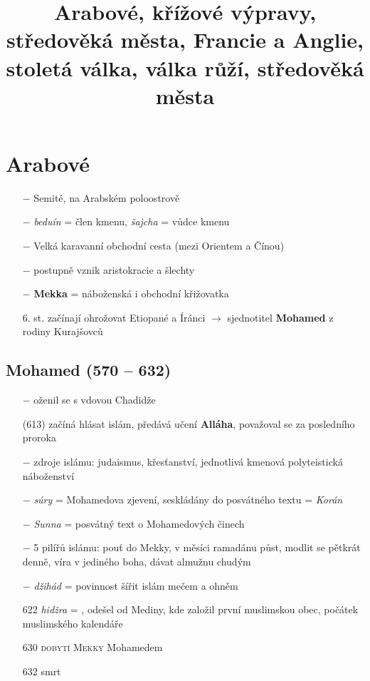 \documentclass{article}
\title{\vspace{-2cm}Arabové, křížové výpravy, středověká města, Francie a Anglie, stoletá válka, válka růží, středověká města\vspace{-1.7cm}}
\date{}
\author{}
\begin{document}
\maketitle

\section*{Arabové}

\begin{itemize}
    \vspace{-0.5em}
    \setlength\itemsep{0.15em}
    \item[$-$] Semité, na Arabském poloostrově
    \item[$-$] \textit{beduín} = člen kmenu, \textit{šajcha} = vůdce kmenu
    \item[$-$] Velká karavanní obchodní cesta (mezi Orientem a Čínou)
    \item[$-$] postupně vznik aristokracie a šlechty
    \item[$-$] \textbf{Mekka} = náboženská i obchodní křižovatka
    \item[6. st.] začínají ohrožovat Etiopané a Íránci $\rightarrow$ sjednotitel \textbf{Mohamed} z rodiny Kurajšovců
\end{itemize}

\subsection*{Mohamed (570 -- 632)}
\begin{itemize}
    \vspace{-0.5em}
    \setlength\itemsep{0.15em}
    \item[$-$] oženil se s vdovou Chadidže
    \item[(613)] začíná hlásat islám, předává učení \textbf{Alláha}, považoval se za posledního proroka
    \item[$-$] zdroje islámu: judaismus, křesťanství, jednotlivá kmenová polyteistická náboženství
    \item[$-$] \textit{súry} = Mohamedova zjevení, seskládány do posvátného textu = \textit{Korán}
    \item[$-$] \textit{Sunna} = posvátný text o Mohamedových činech
    \item[$-$] 5 pilířů islámu: pouť do Mekky, v měsíci ramadánu půst, modlit se pětkrát denně, víra v jediného boha, dávat almužnu chudým
    \item[$-$] \textit{džihád} = povinnost šířit islám mečem a ohněm
    \item[622] \textit{hidžra} = , odešel od Mediny, kde založil první muslimskou obec, počátek muslimského kalendáře
    \item[630] \textsc{dobytí Mekky} Mohamedem
    \item[632] smrt
\end{itemize}
\end{document}
